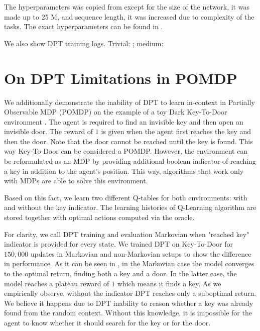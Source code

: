 \documentclass{article}
\begin{document}
The hyperparameters was copied from \citep{lee2023supervised} except for the size of the network, it was made up to 25 M, and sequence length, it was increased due to complexity of the tasks. The exact hyperparameters can be found in .

We also show DPT training logs. Trivial: \href{https://wandb.ai/dunnolab/xminigrid-datasets?nw=smrpeqzlu6a}{\color{blue}{wandb}}; medium: \href{https://wandb.ai/dunnolab/xminigrid-datasets?nw=pfg0umx9c5d}{\color{blue}{wandb}}


\section{On DPT Limitations in POMDP}
\label{apndx:dpt-pomdp}
We additionally demonstrate the inability of DPT to learn in-context in Partially Observable MDP (POMDP) on the example of a toy Dark Key-To-Door environment \citep{laskin2022context}. The agent is required to find an invisible key and then open an invisible door. The reward of $1$ is given when the agent first reaches the key and then the door. Note that the door cannot be reached until the key is found. This way Key-To-Door can be considered a POMDP. However, the environment can be reformulated as an MDP by providing additional boolean indicator of reaching a key in addition to the agent's position. This way, algorithms that work only with MDPs are able to solve this environment.

Based on this fact, we learn two different Q-tables for both environments: with and without the key indicator. The learning histories of Q-Learning algorithm are stored together with optimal actions computed via the oracle.

For clarity, we call DPT training and evaluation Markovian when "reached key" indicator is provided for every state. We trained DPT on Key-To-Door for $150,000$ updates in Markovian and non-Markovian setups to show the difference in performance. As it can be seen in , in the Markovian case the model converges to the optimal return, finding both a key and a door. In the latter case, the model reaches a plateau reward of $1$ which means it finds a key. As we empirically observe, without the indicator DPT reaches only a suboptimal return. We believe it happens due to DPT inability to reason whether a key was already found from the random context. Without this knowledge, it is impossible for the agent to know whether it should search for the key or for the door.
\end{document}
